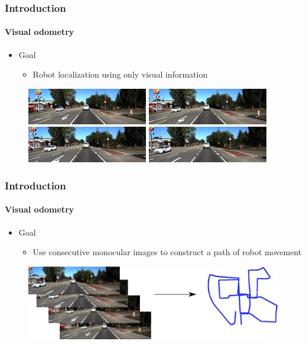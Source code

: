 \documentclass{beamer}
\begin{document}
\begin{frame}
    \frametitle{Introduction}
    \framesubtitle{Visual odometry}
    \begin{itemize}
        \item Goal
        \begin{itemize}
            \item Robot localization using only visual information
        \end{itemize}
    \end{itemize}
    \begin{figure}
        \includegraphics[scale=0.8]{images/road1.png}
        \includegraphics[scale=0.8]{images/road2.png}
        \includegraphics[scale=0.8]{images/road3.png}
        \includegraphics[scale=0.8]{images/road4.png}
    \end{figure}
\end{frame}

\begin{frame}
    \frametitle{Introduction}
    \framesubtitle{Visual odometry}
    \begin{itemize}
        \item Goal
        \begin{itemize}
            \item Use consecutive monocular images to construct a path of robot movement
        \end{itemize}
    \end{itemize}
    \begin{figure}
        \includegraphics[scale=0.8]{images/vo-objective.png}
    \end{figure}
\end{frame}
\end{document}
